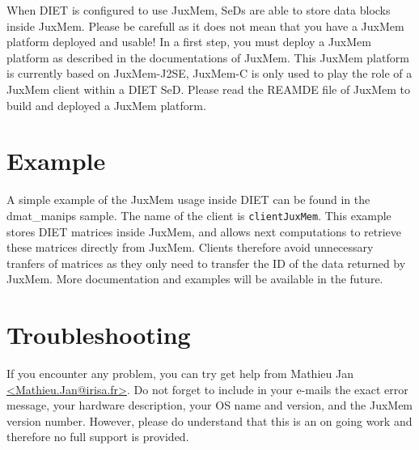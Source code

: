 When DIET is configured to use JuxMem, SeDs are able to store data
blocks inside JuxMem. Please be carefull as it does not mean that you
have a JuxMem platform deployed and usable!  In a first step, you must
deploy a JuxMem platform as described in the documentations of
JuxMem. This JuxMem platform is currently based on JuxMem-J2SE,
JuxMem-C is only used to play the role of a JuxMem client within a
DIET SeD. Please read the REAMDE file of JuxMem to build and deployed
a JuxMem platform.

\section{Example}

A simple example of the JuxMem usage inside DIET can be found in the
dmat\_manips sample. The name of the client is
\texttt{clientJuxMem}. This example stores DIET matrices inside JuxMem, 
and allows next computations to retrieve these matrices directly from
JuxMem. Clients therefore avoid unnecessary tranfers of matrices as
they only need to transfer the ID of the data returned by JuxMem. More
documentation and examples will be available in the future.

\section{Troubleshooting}

If you encounter any problem, you can try get help from Mathieu Jan
\url{<Mathieu.Jan@irisa.fr>}. Do not forget to 
include in your e-mails the exact error message, your hardware
description, your OS name and version, and the JuxMem version number.
However, please do understand that this is an on going work and
therefore no full support is provided.
